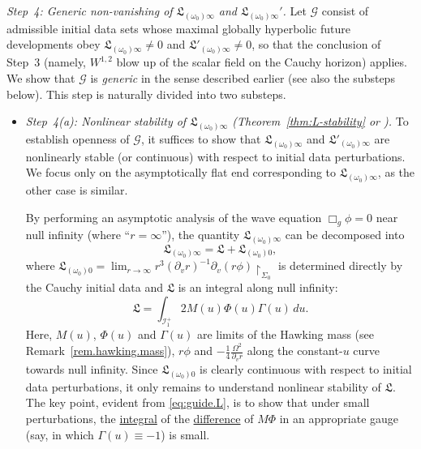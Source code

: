 \documentclass[10pt, reqno]{amsart}
\theoremstyle{definition}
\theoremstyle{remark}
\numberwithin{equation}{section}
\newcommand{\rd}{\partial}
\newcommand{\0}{\emptyset}
\newcommand{\Gmm}{\Gamma}
\newcommand{\Sgm}{\Sigma}
\newcommand{\omg}{\omega}
\newcommand{\Omg}{\Omega}
\newcommand{\calG}{\mathcal G}
\newcommand{\calI}{\mathcal I}
\newcommand{\pfstep}[1]{\vspace{.5em} {\it \noindent #1.}}
\newcommand{\NI}{\calI^{+}}						%
\begin{document}
\pfstep{Step~4: Generic non-vanishing of $\mathfrak L_{(\omg_{0}) \infty}$ and $\mathfrak L_{(\omg_{0}) \infty}'$} 
Let $\calG$ consist of admissible initial data sets whose maximal globally hyperbolic future developments obey $\mathfrak L_{(\omg_{0}) \infty} \neq 0$ and $\mathfrak L'_{(\omg_{0}) \infty} \neq 0$, so that the conclusion of Step~3 (namely, $W^{1,2}$ blow up of the scalar field on the Cauchy horizon) applies. We show that $\calG$ is \emph{generic} in the sense described earlier (see also the substeps below). This step is naturally divided into two substeps.
\begin{itemize}
\item \pfstep{Step~4(a): Nonlinear stability of $\mathfrak L_{(\omg_{0}) \infty}$ (Theorem~\ref{thm:L-stability} or \cite[Theorem~4.2]{LO.exterior})}
To establish openness of $\calG$, it suffices to show that $\mathfrak L_{(\omg_{0}) \infty}$ and $\mathfrak L'_{(\omg_{0}) \infty}$ are nonlinearly stable (or continuous) with respect to initial data perturbations. We focus only on the asymptotically flat end corresponding to $\mathfrak{L}_{(\omg_{0}) \infty}$, as the other case is similar. 

By performing an asymptotic analysis of the wave equation $\Box_{g} \phi = 0$ near null infinity (where ``$r = \infty$''), the quantity $\mathfrak{L}_{(\omg_{0}) \infty}$ can be decomposed into
\begin{equation*}
	\mathfrak L_{(\omg_{0}) \infty} = \mathfrak L + \mathfrak L_{(\omg_{0}) 0},
\end{equation*}
where $\mathfrak L_{(\omg_{0}) 0} = \lim_{r \to \infty} r^{3} (\rd_{v} r)^{-1} \rd_{v} (r \phi) \restriction_{\Sgm_{0}}$ is determined directly by the Cauchy initial data  and $\mathfrak L$ is an integral along null infinity:
\begin{equation} \label{eq:guide.L}
	\mathfrak L = \int_{\NI_{1}} 2 M(u) \Phi(u) \Gmm(u) \, d u.
\end{equation}
Here, $M(u)$, $\Phi(u)$ and $\Gmm(u)$ are limits of the Hawking mass (see Remark~\ref{rem.hawking.mass}), $r \phi$ and $-\frac{1}{4} \frac{\Omg^{2}}{\rd_{v} r}$ along the constant-$u$ curve towards null infinity. Since $\mathfrak L_{(\omg_{0}) 0}$ is clearly continuous with respect to initial data perturbations, it only remains to understand nonlinear stability of $\mathfrak L$. The key point, evident from \eqref{eq:guide.L}, is to show that under small perturbations, the \underline{integral} of the \underline{difference} of $M \Phi$ in an appropriate gauge (say, in which $\Gmm(u) \equiv -1$) is small.


\end{itemize}
\end{document}
